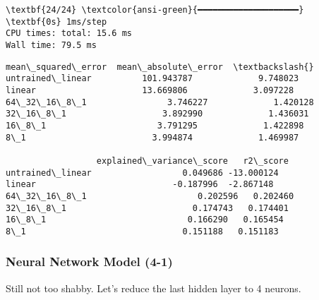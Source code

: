 \documentclass[11pt]{article}
\makeatletter
\newcommand{\boxspacing}{\kern\kvtcb@left@rule\kern\kvtcb@boxsep}
\newcommand{\prompt}[4]{
        {\ttfamily\llap{{\color{#2}[#3]:\hspace{3pt}#4}}\vspace{-\baselineskip}}
    }
\makeatother
\begin{document}
    \begin{Verbatim}[commandchars=\\\{\}]
\textbf{24/24} \textcolor{ansi-green}{━━━━━━━━━━━━━━━━━━━━} \textbf{0s} 1ms/step
CPU times: total: 15.6 ms
Wall time: 79.5 ms
    \end{Verbatim}

            \begin{tcolorbox}[breakable, size=fbox, boxrule=.5pt, pad at break*=1mm, opacityfill=0]
\prompt{Out}{outcolor}{24}{\boxspacing}
\begin{Verbatim}[commandchars=\\\{\}]
                  mean\_squared\_error  mean\_absolute\_error  \textbackslash{}
untrained\_linear          101.943787             9.748023
linear                     13.669806             3.097228
64\_32\_16\_8\_1                3.746227             1.420128
32\_16\_8\_1                   3.892990             1.436031
16\_8\_1                      3.791295             1.422898
8\_1                         3.994874             1.469987

                  explained\_variance\_score   r2\_score
untrained\_linear                  0.049686 -13.000124
linear                           -0.187996  -2.867148
64\_32\_16\_8\_1                      0.202596   0.202460
32\_16\_8\_1                         0.174743   0.174401
16\_8\_1                            0.166290   0.165454
8\_1                               0.151188   0.151183
\end{Verbatim}
\end{tcolorbox}
        
    \subsubsection{Neural Network Model
(4-1)}\label{neural-network-model-4-1}

Still not too shabby. Let's reduce the last hidden layer to 4 neurons.
\end{document}
